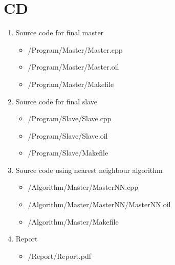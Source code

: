\chapter{CD} \label{app:CD}


\begin{enumerate}
\item Source code for final master
\begin{itemize}
\item /Program/Master/Master.cpp
\item /Program/Master/Master.oil 
\item /Program/Master/Makefile
\end{itemize}
\item Source code for final slave
\begin{itemize}
\item /Program/Slave/Slave.cpp
\item /Program/Slave/Slave.oil
\item /Program/Slave/Makefile
\end{itemize}
\item Source code using nearest neighbour algorithm
\begin{itemize}
\item /Algorithm/Master/MasterNN.cpp
\item /Algorithm/Master/MasterNN/MasterNN.oil
\item /Algorithm/Master/Makefile
\end{itemize}
\item Report
\begin{itemize}
\item /Report/Report.pdf
\end{itemize}
\end{enumerate}

